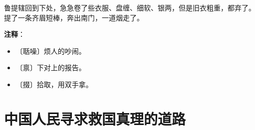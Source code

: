 \documentclass[12pt,UTF-8,openany]{ctexbook}
\begin{document}
\begin{normalsize}
    鲁提辖回到下处，急急卷了些衣服、盘缠、细软、银两，但是旧衣粗重，都弃了。提了一条齐眉短棒，奔出南门，一道烟走了。
    
\end{normalsize}


\newpage

\textbf{注释}：

\vspace{-1em}

\begin{itemize}
    \setlength\itemsep{-0.2em}
    \item 〔聒噪〕烦人的吵闹。
    \item 〔禀〕下对上的报告。
    \item 〔掇〕拾取，用双手拿。
\end{itemize}

\chapter{中国人民寻求救国真理的道路}
\end{document}
